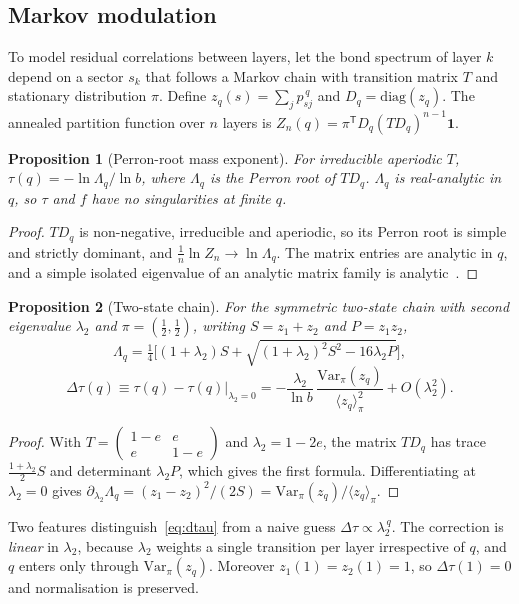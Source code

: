 \documentclass[11pt]{article}
\newtheorem{proposition}{Proposition}[section]
\theoremstyle{definition}\newtheorem{definition}{Definition}[section]
\theoremstyle{remark}\newtheorem*{remark}{Remark}
\begin{document}
\subsection{Markov modulation}
To model residual correlations between layers, let the bond spectrum of layer $k$ depend on a sector $s_k$
that follows a Markov chain with transition matrix $T$ and stationary distribution $\pi$. Define
$z_q(s)=\sum_jp_{sj}^{\,q}$ and $D_q=\mathrm{diag}(z_q)$. The annealed partition function over $n$ layers is
$Z_n(q)=\pi^{\mathsf T}D_q(TD_q)^{n-1}\mathbf 1$.

\begin{proposition}[Perron-root mass exponent]
\label{prop:perron}
For irreducible aperiodic $T$, $\tau(q)=-\ln\Lambda_q/\ln b$, where $\Lambda_q$ is the Perron root of $TD_q$.
$\Lambda_q$ is real-analytic in $q$, so $\tau$ and $f$ have no singularities at finite $q$.
\end{proposition}
\begin{proof}
$TD_q$ is non-negative, irreducible and aperiodic, so its Perron root is simple and strictly dominant,
and $\frac1n\ln Z_n\to\ln\Lambda_q$. The
matrix entries are analytic in $q$, and a simple isolated eigenvalue of an analytic matrix family is
analytic~\cite{Kato}.
\end{proof}

\begin{proposition}[Two-state chain]
\label{prop:twostate}
For the symmetric two-state chain with second eigenvalue $\lambda_2$ and $\pi=(\tfrac12,\tfrac12)$, writing
$S=z_1+z_2$ and $P=z_1z_2$,
\begin{equation}
\Lambda_q=\tfrac14\Big[(1+\lambda_2)S+\sqrt{(1+\lambda_2)^2S^2-16\lambda_2P}\Big],
\end{equation}
\begin{equation}
\Delta\tau(q)\equiv\tau(q)-\tau(q)\big|_{\lambda_2=0}=-\frac{\lambda_2}{\ln b}\,\frac{\mathrm{Var}_\pi(z_q)}{\langle z_q\rangle_\pi^2}+O(\lambda_2^2).
\label{eq:dtau}
\end{equation}
\end{proposition}
\begin{proof}
With $T=\begin{pmatrix}1-e&e\\e&1-e\end{pmatrix}$ and $\lambda_2=1-2e$, the matrix $TD_q$ has trace
$\frac{1+\lambda_2}{2}S$ and determinant $\lambda_2P$, which gives the first formula. Differentiating at $\lambda_2=0$
gives $\partial_{\lambda_2}\Lambda_q=(z_1-z_2)^2/(2S)=\mathrm{Var}_\pi(z_q)/\langle z_q\rangle_\pi$.
\end{proof}
Two features distinguish~\eqref{eq:dtau} from a naive guess $\Delta\tau\propto\lambda_2^{\,q}$. The correction is
\emph{linear} in $\lambda_2$, because $\lambda_2$ weights a single transition per layer irrespective of $q$, and $q$
enters only through $\mathrm{Var}_\pi(z_q)$. Moreover $z_1(1)=z_2(1)=1$, so $\Delta\tau(1)=0$ and normalisation is
preserved.
\end{document}
